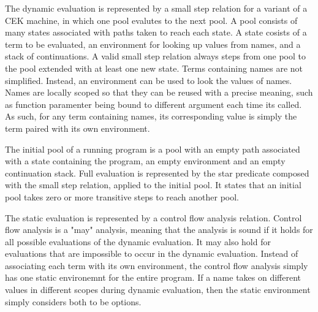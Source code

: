 \documentclass[letterpaper, 11pt]{extarticle}
\begin{document}
The dynamic evaluation is represented by a small step relation for a variant of a CEK machine, in which one pool evalutes
to the next pool. A pool consists of many states associated with paths taken to reach each state.  A state cosists
of a term to be evaluated, an environment for looking up values from names, and a stack of continuations.
A valid small step relation always steps from one pool to the pool extended with at least one new state.
Terms containing names are not simplified.  Instead, an environment can be used to look the values of names.
Names are locally scoped so that they can be reused with a precise meaning, such as function paramenter being bound to
different argument each time its called. As such, for any term containing names, its corresponding value is simply
the term paired with its own environment.

The initial pool of a running program is a pool with an empty path associated with a state containing the program,
an empty environment and an empty continuation stack.
Full evaluation is represented by the star predicate composed with the small step relation, applied to the initial pool.
It states that an initial pool takes zero or more transitive steps to reach another pool.

The static evaluation is represented by a control flow analysis relation. Control flow analysis is a "may" analysis,
meaning that the analysis is sound if it holds for all possible evaluations of the dynamic evaluation.
It may also hold for evaluations that are impossible to occur in the dynamic evaluation.
Instead of associating each term with its own environment, the control flow analysis simply has one static environemnt
for the entire program. If a name takes on different values in different scopes during dynamic evaluation, then
the static environment simply considers both to be options. 
\end{document}
